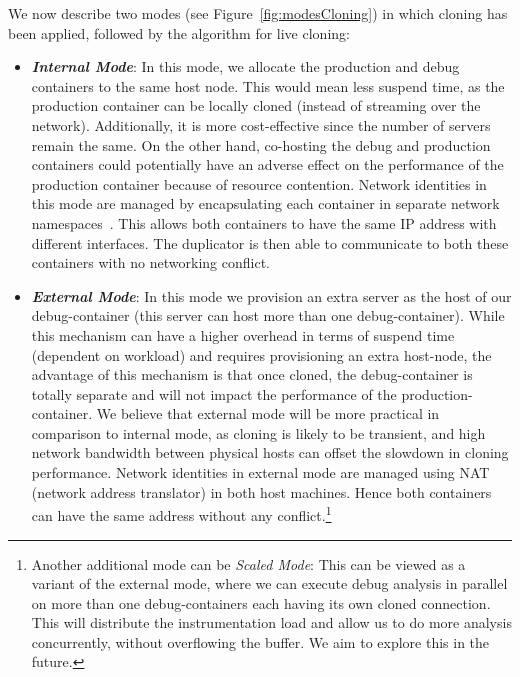 \noindent
We now describe two modes (see Figure~\ref{fig:modesCloning}) in which cloning has been applied, followed by the algorithm for live cloning:

\begin{itemize}
 
\item \textbf{\textit{Internal Mode}}: In this mode, we allocate the production and debug containers to the same host node. 
This would mean less suspend time, as the production container can be locally cloned (instead of streaming over the network). 
Additionally, it is more cost-effective since the number of servers remain the same.
On the other hand, co-hosting the debug and production containers could potentially have an adverse effect on the performance of the production container because of resource contention.
Network identities in this mode are managed by encapsulating each container in separate network namespaces~\cite{netns}.
This allows both containers to have the same IP address with different interfaces.
The duplicator is then able to communicate to both these containers with no networking conflict.


\item \textbf{\textit{External Mode}}: In this mode we provision an extra server as the host of our debug-container (this server can host more than one debug-container). 
While this mechanism can have a higher overhead in terms of suspend time (dependent on workload) and requires provisioning an extra host-node, the advantage of this mechanism is that once cloned, the debug-container is totally separate and will not impact the performance of the production-container.
We believe that external mode will be more practical in comparison to internal mode, as cloning is likely to be transient, and high network bandwidth between physical hosts can offset the slowdown in cloning performance. 
Network identities in external mode are managed using NAT~\cite{nat} (network address translator) in both host machines. 
Hence both containers can have the same address without any conflict.\footnote{Another additional mode can be \textit{Scaled Mode}: This can be viewed as a variant of the external mode, where we can execute debug analysis in parallel on more than one debug-containers each having its own cloned connection. This will distribute the instrumentation load and allow us to do more analysis concurrently, without overflowing the buffer. We aim to explore this in the future.}

\end{itemize}

